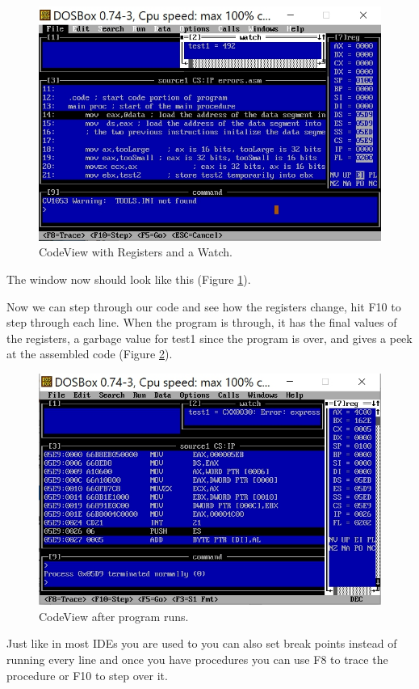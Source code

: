 \begin{figure}
  \includegraphics[width=\linewidth]{images/watchCV.jpg}
  \caption{CodeView with Registers and a Watch.}
  \label{fig:cv2}
\end{figure}
The window now should look like this (Figure \ref{fig:cv2}). 

Now we can step through our code and see how the registers change, hit F10 to step through each line.  When the program is through, it has the final values of the registers, a garbage value for test1 since the program is over, and gives a peek at the assembled code (Figure \ref{fig:cv3}).  
\begin{figure}
  \includegraphics[width=\linewidth]{images/endCV.jpg}
  \caption{CodeView after program runs.}
  \label{fig:cv3}
\end{figure}
Just like in most IDEs you are used to you can also set break points instead of running every line and once you have procedures you can use F8 to trace the procedure or F10 to step over it.  
%
